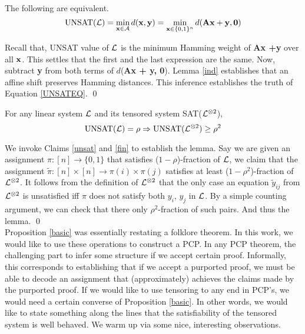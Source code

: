 {%

\begin{proposition} \label{unsat}
The following are equivalent.
\begin{equation}
                \mbox{UNSAT(}{\cal L}\mbox{)} = \min_{{\bf x} \in {\cal A}} d({\bf x, y}) = \min_{{\bf x} \in \{0,1\}^n} d({\bf Ax + y, 0}) \label{UNSATEQ}
\end{equation}
\end{proposition}
 Recall that, UNSAT value of ${\cal L}$ is the
minimum Hamming weight of {\bf Ax +y} over all ${\bf x}$. This settles
that the first and the last expression are the same. Now, subtract
{\bf y} from both terms of $d$({\bf Ax + y, 0}). Lemma \ref{ind}
establishes that an affine shift preserves Hamming distances. This
inference establishes the truth of Equation \eqref{UNSATEQ}. \qed

\begin{proposition}\label{basic}
For any linear system ${\cal L}$ and its tensored system SAT(${\cal L}^{\otimes 2}$),
\[
    \mbox{UNSAT}({\cal L}) = \rho \Rightarrow \mbox{UNSAT}({\cal L}^{\otimes 2})   \ge \rho^2  
\]
\end{proposition}
 We invoke Claims \ref{unsat} and \ref{fin}
to establish the lemma. Say we are given an assignment $\pi : [n]
\rightarrow \{0,1\}$ that satisfies ($1 - \rho$)-fraction of ${\cal L}$, we
claim that the assignment $\tilde{\pi} : [n] \times [n] \rightarrow
\pi(i) \times \pi(j)$ satisfies at least ($1 - \rho^2$)-fraction of
${\cal L}^{\otimes 2}$. It follows from the definition of ${\cal L}^{\otimes 2}$
that the only case an equation $\tilde{y}_{ij}$ from ${\cal L}^{\otimes
  2}$ is unsatisfied iff $\pi$ does not satisfy both $y_i$, $y_j$ in
${\cal L}$. By a simple counting argument, we can check that there only
$\rho^2$-fraction of such pairs. And thus the lemma. \qed \\


\noindent Proposition \ref{basic} was essentially restating a folklore
theorem. In this work, we would like to use these operations to
construct a PCP. In any PCP theorem, the challenging part to infer
some structure if we accept certain proof. Informally, this
corresponds to establishing that if we accept a purported proof, we
must be able to decode an assignment that (approximately) achieves the
claims made by the purported proof. If we would like to use tensoring
to any end in PCP's, we would need a certain converse of Proposition
\ref{basic}. In other words, we would like to state something along
the lines that the satisfiability of the tensored system is well
behaved. We warm up via some nice, interesting observations.

}
